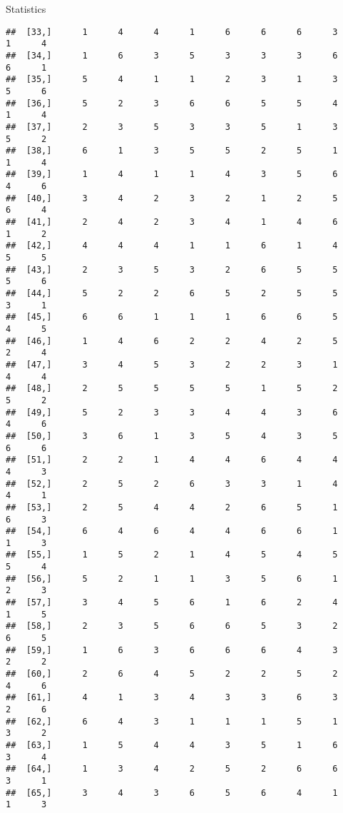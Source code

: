 \documentclass[
  ignorenonframetext,
]{beamer}
\begin{document}
\begin{frame}[fragile]{Statistics}
\begin{verbatim}
##  [33,]      1      4      4      1      6      6      6      3      1      4
##  [34,]      1      6      3      5      3      3      3      6      6      1
##  [35,]      5      4      1      1      2      3      1      3      5      6
##  [36,]      5      2      3      6      6      5      5      4      1      4
##  [37,]      2      3      5      3      3      5      1      3      5      2
##  [38,]      6      1      3      5      5      2      5      1      1      4
##  [39,]      1      4      1      1      4      3      5      6      4      6
##  [40,]      3      4      2      3      2      1      2      5      6      4
##  [41,]      2      4      2      3      4      1      4      6      1      2
##  [42,]      4      4      4      1      1      6      1      4      5      5
##  [43,]      2      3      5      3      2      6      5      5      5      6
##  [44,]      5      2      2      6      5      2      5      5      3      1
##  [45,]      6      6      1      1      1      6      6      5      4      5
##  [46,]      1      4      6      2      2      4      2      5      2      4
##  [47,]      3      4      5      3      2      2      3      1      4      4
##  [48,]      2      5      5      5      5      1      5      2      5      2
##  [49,]      5      2      3      3      4      4      3      6      4      6
##  [50,]      3      6      1      3      5      4      3      5      6      6
##  [51,]      2      2      1      4      4      6      4      4      4      3
##  [52,]      2      5      2      6      3      3      1      4      4      1
##  [53,]      2      5      4      4      2      6      5      1      6      3
##  [54,]      6      4      6      4      4      6      6      1      1      3
##  [55,]      1      5      2      1      4      5      4      5      5      4
##  [56,]      5      2      1      1      3      5      6      1      2      3
##  [57,]      3      4      5      6      1      6      2      4      1      5
##  [58,]      2      3      5      6      6      5      3      2      6      5
##  [59,]      1      6      3      6      6      6      4      3      2      2
##  [60,]      2      6      4      5      2      2      5      2      4      6
##  [61,]      4      1      3      4      3      3      6      3      2      6
##  [62,]      6      4      3      1      1      1      5      1      3      2
##  [63,]      1      5      4      4      3      5      1      6      3      4
##  [64,]      1      3      4      2      5      2      6      6      3      1
##  [65,]      3      4      3      6      5      6      4      1      1      3

\end{verbatim}
\end{frame}
\end{document}
